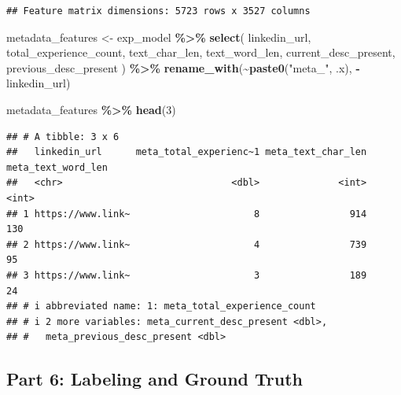 \documentclass[
]{article}
\newenvironment{Shaded}{\begin{snugshade}}{\end{snugshade}}
\newcommand{\DecValTok}[1]{\textcolor[rgb]{0.00,0.00,0.81}{#1}}
\newcommand{\FunctionTok}[1]{\textcolor[rgb]{0.13,0.29,0.53}{\textbf{#1}}}
\newcommand{\NormalTok}[1]{#1}
\newcommand{\OtherTok}[1]{\textcolor[rgb]{0.56,0.35,0.01}{#1}}
\newcommand{\SpecialCharTok}[1]{\textcolor[rgb]{0.81,0.36,0.00}{\textbf{#1}}}
\newcommand{\StringTok}[1]{\textcolor[rgb]{0.31,0.60,0.02}{#1}}
\begin{document}
\begin{verbatim}
## Feature matrix dimensions: 5723 rows x 3527 columns
\end{verbatim}

\begin{Shaded}
\begin{Highlighting}[]
\NormalTok{metadata\_features }\OtherTok{\textless{}{-}}\NormalTok{ exp\_model }\SpecialCharTok{\%\textgreater{}\%}
  \FunctionTok{select}\NormalTok{(}
\NormalTok{    linkedin\_url,}
\NormalTok{    total\_experience\_count,}
\NormalTok{    text\_char\_len,}
\NormalTok{    text\_word\_len,}
\NormalTok{    current\_desc\_present,}
\NormalTok{    previous\_desc\_present}
\NormalTok{  ) }\SpecialCharTok{\%\textgreater{}\%}
  \FunctionTok{rename\_with}\NormalTok{(}\SpecialCharTok{\textasciitilde{}}\FunctionTok{paste0}\NormalTok{(}\StringTok{"meta\_"}\NormalTok{, .x), }\SpecialCharTok{{-}}\NormalTok{linkedin\_url)}

\NormalTok{metadata\_features }\SpecialCharTok{\%\textgreater{}\%} \FunctionTok{head}\NormalTok{(}\DecValTok{3}\NormalTok{)}
\end{Highlighting}
\end{Shaded}

\begin{verbatim}
## # A tibble: 3 x 6
##   linkedin_url      meta_total_experienc~1 meta_text_char_len meta_text_word_len
##   <chr>                              <dbl>              <int>              <int>
## 1 https://www.link~                      8                914                130
## 2 https://www.link~                      4                739                 95
## 3 https://www.link~                      3                189                 24
## # i abbreviated name: 1: meta_total_experience_count
## # i 2 more variables: meta_current_desc_present <dbl>,
## #   meta_previous_desc_present <dbl>
\end{verbatim}

\subsection{Part 6: Labeling and Ground
Truth}\label{part-6-labeling-and-ground-truth}
\end{document}

